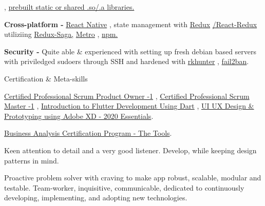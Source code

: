 \begin{skillsentries}
{\begin{skillsitems}
{        , 
        {\href{https://developer.android.com/ndk/guides/prebuilts}{prebuilt static or shared .so/.a libraries.}}}
        \item {\textbf{Cross-platform -} 
        {\href{https://facebook.github.io/react-native/}{React Native}}
        , state management with 
        {\href{https://redux.js.org}{Redux}}
        {\href{https://react-redux.js.org}{/React-Redux }}
        utiliziing 
        {\href{https://redux-saga.js.org}{Redux-Saga,}} 
        {\href{https://github.com/facebook/metro}{Metro}}
        ,
         {\href{https://www.npmjs.com}{npm.}}}
        \item {\textbf{Security - } Quite able \& experienced with setting up fresh debian based servers with priviledged sudoers through SSH and hardened with 
        {\href{http://rkhunter.sourceforge.net}{rkhunter}}
        ,
        {\href{https://www.fail2ban.org/wiki/index.php/Main_Page}{fail2ban}}.}
      \end{skillsitems}
    }

    
    \skillsentry
    {Certification \& Meta-skills} %
    {
      \begin{skillsitems} %
        \item {\href{https://drive.google.com/file/d/1fdSWNFiLBkGYV_nA-rcCtlR71gU7HSAv/view?usp=sharing}{Certified Professional Scrum Product Owner -1}
        , \href{https://drive.google.com/file/d/1jtFr7MJL4iW_3NKuQqpC7Jdc7T2w5R99/view?usp=sharing}{Certified Professional Scrum Master -1}
        , \href{https://drive.google.com/file/d/1U15zqely5Y4aUvPV6STjewR5rzNdkghe/view?usp=sharing}{Introduction to Flutter Development Using Dart} 
        , \href{http://ude.my/UC-1eea6925-e5cc-4c74-aa8f-a8205c341d13}{UI UX Design \& Prototyping using Adobe XD - 2020 Essentials}.}
        \item {\href{http://ude.my/UC-dbf43b00-3bb0-4607-b137-79c1425a9109}{Business Analysis Certification Program - The Tools}.}
        \item {Keen attention to detail and a very good listener. Develop, while keeping design patterns in mind.}
        \item {Proactive problem solver with craving to make app robust, scalable, modular and testable. Team-worker, inquisitive, communicable, 
        dedicated to continuously developing, implementing, and adopting new technologies.}
      \end{skillsitems}
      }
      
\end{skillsentries}
